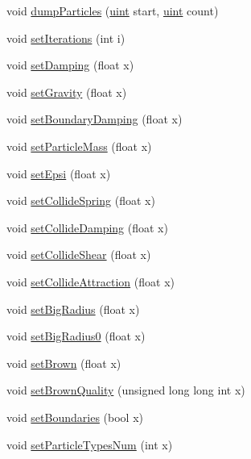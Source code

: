 \begin{DoxyCompactItemize}
\item 
void \hyperlink{class_particle_system_a9025f319e07c58c6ece1cd2a620ce33a}{dump\-Particles} (\hyperlink{particles__kernel_8cuh_a91ad9478d81a7aaf2593e8d9c3d06a14}{uint} start, \hyperlink{particles__kernel_8cuh_a91ad9478d81a7aaf2593e8d9c3d06a14}{uint} count)
\item 
void \hyperlink{class_particle_system_a11f55976f6ef34dceea208fbe06694cd}{set\-Iterations} (int i)
\item 
void \hyperlink{class_particle_system_aa26996b9ca13499b13f944f3aaeae10c}{set\-Damping} (float x)
\item 
void \hyperlink{class_particle_system_a755f64f917389ef41df81b663d1f5bd2}{set\-Gravity} (float x)
\item 
void \hyperlink{class_particle_system_a1b17ae9291cf9974f63219cc9eac6ec6}{set\-Boundary\-Damping} (float x)
\item 
void \hyperlink{class_particle_system_a92e1db62e4025fab4996ce9a3ca5882f}{set\-Particle\-Mass} (float x)
\item 
void \hyperlink{class_particle_system_a6290c054a797ec9fa691179ffb4631f7}{set\-Epsi} (float x)
\item 
void \hyperlink{class_particle_system_a7ed53fca9ef126898d29314478ec8fd4}{set\-Collide\-Spring} (float x)
\item 
void \hyperlink{class_particle_system_a8f8d21c7079c3a0e66558b9ec5bef597}{set\-Collide\-Damping} (float x)
\item 
void \hyperlink{class_particle_system_aea667093542a1bdad65bdcb427e5625f}{set\-Collide\-Shear} (float x)
\item 
void \hyperlink{class_particle_system_aef02d293e3dc61c50fa6d085aa0b03de}{set\-Collide\-Attraction} (float x)
\item 
void \hyperlink{class_particle_system_a97efe00aa29307ecae0165da33d4770a}{set\-Big\-Radius} (float x)
\item 
void \hyperlink{class_particle_system_a55005091f11f7e9734c6b3fd2f1a5b1c}{set\-Big\-Radius0} (float x)
\item 
void \hyperlink{class_particle_system_a01a5d2e20d18dcd29fa7f8f9bc5f75e9}{set\-Brown} (float x)
\item 
void \hyperlink{class_particle_system_a0b8c24c273a5a89ba27c7b6c949d2ce1}{set\-Brown\-Quality} (unsigned long long int x)
\item 
void \hyperlink{class_particle_system_a99bbe16b8e181415c2aa71c11edace98}{set\-Boundaries} (bool x)
\item 
void \hyperlink{class_particle_system_ac82e5fa73b2b91dfa44db14daa37b389}{set\-Particle\-Types\-Num} (int x)

\end{DoxyCompactItemize}
